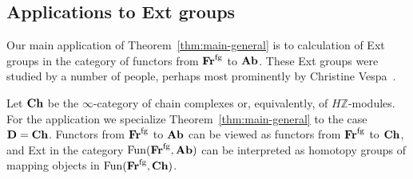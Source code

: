 \documentclass[psamsfonts]{amsart}
\theoremstyle{plain}
\theoremstyle{definition}
\theoremstyle{remark}
\newcommand{\Z}{\mathbb{Z}}
\newcommand{\catname}[1]{{\normalfont\textbf{#1}}}
\newcommand{\fr}{\allfr^{\mathrm{fg}}}
\newcommand{\allfr}{\catname{Fr}}
\newcommand{\ab}{\catname{Ab}}
\newcommand{\ch}{\catname{Ch}}
\DeclareMathOperator{\fun}{Fun}
\begin{document}
\subsection{Applications to Ext groups} \label{subsec:applications} Our main application of Theorem~\ref{thm:main-general} is to calculation of Ext groups in the category of functors from $\fr$ to $\ab$. These Ext groups were studied by a number of people, perhaps most prominently by Christine Vespa~\cite{Vespa2018}.

Let $\ch$ be the $\infty$-category of chain complexes or, equivalently, of $H\Z$-modules. For the application we specialize Theorem~\ref{thm:main-general} to the case $\catname{D}=\ch$. Functors from $\fr$ to $\ab$ can be viewed as functors from $\fr$ to $\ch$, and Ext in the category $\fun(\fr, \ab)$ can be interpreted as homotopy groups of mapping objects in $\fun(\fr, \ch)$.
\end{document}
